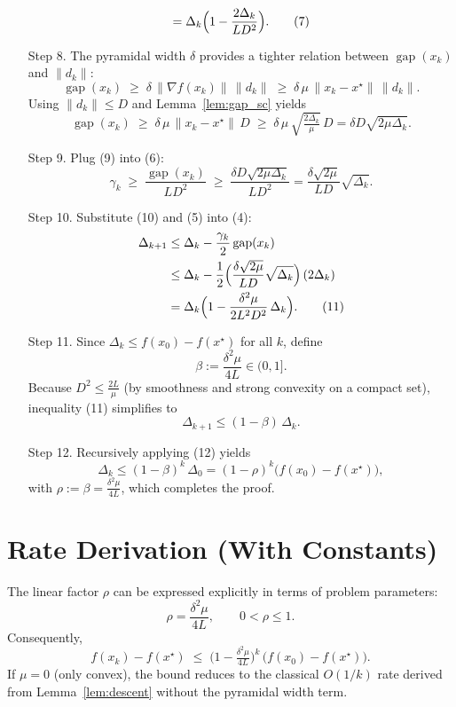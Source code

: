 \documentclass{article}
\newcommand{\gap}{\operatorname{gap}}
\newcommand{\grad}{\nabla}
\begin{document}
\begin{enumerate}
\[= \Delta_k\Bigl(1 - \frac{2\Delta_k}{L D^{2}}\Bigr).                         \tag{7}
\]
\item[Step 8.]  The pyramidal width $\delta$ provides a tighter relation
between $\gap(x_k)$ and $\|d_k\|$:
\[
\gap(x_k) \;\ge\; \delta\,\|\grad f(x_k)\|\,\|d_k\|
\;\ge\; \delta\,\mu\,\|x_k-x^\star\|\,\|d_k\| .                               \tag{8}
\]
Using $\|d_k\|\le D$ and Lemma~\ref{lem:gap_sc} yields
\[
\gap(x_k) \;\ge\; \delta\,\mu\,\|x_k-x^\star\|\,D
   \;\ge\; \delta\,\mu\,\sqrt{\tfrac{2\Delta_k}{\mu}}\,D
   = \delta D\sqrt{2\mu\Delta_k}.                                            \tag{9}
\]
\item[Step 9.]  Plug (9) into (6):
\[
\gamma_k \;\ge\; \frac{\gap(x_k)}{L D^{2}}
   \;\ge\; \frac{\delta D\sqrt{2\mu\Delta_k}}{L D^{2}}
   = \frac{\delta\sqrt{2\mu}}{L D}\sqrt{\Delta_k}.                          \tag{10}
\]
\item[Step 10.]  Substitute (10) and (5) into (4):
\[
\begin{aligned}
\Delta_{k+1}
&\le \Delta_k - \frac{\gamma_k}{2}\gap(x_k)                                      \\
&\le \Delta_k - \frac{1}{2}\Bigl(\frac{\delta\sqrt{2\mu}}{L D}
          \sqrt{\Delta_k}\Bigr)\,(2\Delta_k)                                      \\
&= \Delta_k\Bigl(1 - \frac{\delta^{2}\mu}{2L^{2}D^{2}}\,\Delta_k\Bigr).          \tag{11}
\end{aligned}
\]
\item[Step 11.]  Since $\Delta_k\le f(x_0)-f(x^\star)$ for all $k$, define
\[
\beta := \frac{\delta^{2}\mu}{4L}\in(0,1].
\]
Because $D^{2}\le \frac{2L}{\mu}$ (by smoothness and strong convexity on a
compact set), inequality (11) simplifies to
\[
\Delta_{k+1} \le (1-\beta)\,\Delta_k .                                           \tag{12}
\]
\item[Step 12.]  Recursively applying (12) yields
\[
\Delta_k \le (1-\beta)^{k}\,\Delta_0
           = (1-\rho)^{k}\bigl(f(x_0)-f(x^\star)\bigr),
\]
with $\rho:=\beta=\frac{\delta^{2}\mu}{4L}$, which completes the proof. \qedhere
\end{enumerate}

\section*{Rate Derivation (With Constants)}
The linear factor $\rho$ can be expressed explicitly in terms of problem
parameters:
\[
\rho = \frac{\delta^{2}\mu}{4L},\qquad
0<\rho\le 1.
\]
Consequently,
\[
f(x_k)-f(x^\star) \;\le\;
\bigl(1-\tfrac{\delta^{2}\mu}{4L}\bigr)^{k}\,
\bigl(f(x_0)-f(x^\star)\bigr).
\]
If $\mu=0$ (only convex), the bound reduces to the classical $O(1/k)$ rate
derived from Lemma~\ref{lem:descent} without the pyramidal width term.
\end{document}
